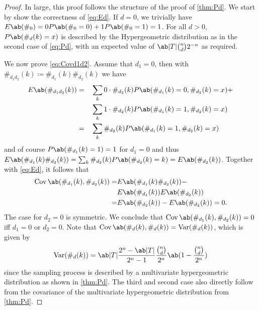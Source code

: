 \begin{proof}
    In large, this proof follows the structure of the proof of \cref{thm:Pd}. We start by show the correctness of \cref{eq:Ed}. If $d = 0$, we trivially have $E\ab(\#_0) = 0 P\ab(\#_0 = 0) + 1 P\ab(\#_0 = 1) = 1$. For all $d > 0$, $P\ab(\#_d (k) = x)$ is described by the Hypergeometric distribution as in the second case of \cref{eq:Pd}, with an expected value of $\ab|T| \binom{n}{d} 2^{-n}$ as 
    required.

    We now prove \cref{eq:Covd1d2}. Assume that $d_1 = 0$, then with $\#_{d_1 d_2}(k) \coloneqq \#_{d_1} (k)\#_{d_2} (k)$ we have
    \begin{alignat*}{2}
        E\ab(\#_{d_1 d_2} (k)) &= &&\sum_k 0 \cdot \#_{d_2} (k) P\ab(\#_{d_1} (k) = 0, \#_{d_2} (k) = x) + \\ 
                                       &  &&\sum_k 1 \cdot \#_{d_2} (k) P\ab(\#_{d_1} (k) = 1, \#_{d_2} (k) = x) \\
                                       &= &&\sum_k \#_{d_2} (k) P\ab(\#_{d_1} (k) = 1, \#_{d_2} (k) = x)
    \end{alignat*}
    and of course $P\ab(\#_{d_1} (k) = 1) = 1$ for $d_1 = 0$ and thus $E\ab(\#_{d_1} (k) \#_{d_2} (k)) = \sum_k \#_{d_2} (k) P\ab(\#_{d_2} (k) = k) = E\ab(\#_{d_2} (k))$. Together with \cref{eq:Ed}, it follows that
    \begin{displaymath}
    \begin{aligned}
        \Cov\ab(\#_{d_1} (k), \#_{d_2} (k)) = &E\ab(\#_{d_1} (k) \#_{d_2} (k)) - \\
                                              &E\ab(\#_{d_1} (k)) E\ab(\#_{d_2} (k)) \\
                                    = &E\ab(\#_{d_2} (k)) - E\ab(\#_{d_2} (k)) = 0.
    \end{aligned}
    \end{displaymath}
    The case for $d_2 = 0$ is symmetric. We conclude that $\Cov\ab(\#_{d_1} (k), \#_{d_2} (k)) = 0$ iff $d_1 = 0$ or $d_2 = 0$. Note that $\Cov\ab(\#_d (k), \#_d (k)) = \Var(\#_d (k))$, which is given by
    \begin{displaymath}
        \Var(\#_d (k)) = \ab|T| \frac{2^n - \ab|T|}{2^n - 1} \frac{\binom{n}{d}}{2^n} \ab(1 - \frac{\binom{n}{d}}{2^n})
    \end{displaymath}
    since the sampling process is described by a multivariate hypergeometric distribution as shown in \cref{thm:Pd}. The third and second case also directly follow from the covariance of the multivariate hypergeometric distribution from \cref{thm:Pd}.
\end{proof}

